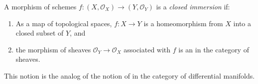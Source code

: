 \documentclass[12pt]{article}
\renewcommand{\O}{\mathcal{O}}
\newcommand{\lra}{\longrightarrow}
\begin{document}
A morphism of schemes $f: (X,\O_X) \lra (Y,\O_Y)$ is a {\em closed immersion} if:
\begin{enumerate}
\item As a map of topological spaces, $f: X \lra Y$ is a homeomorphism from $X$ into a closed subset of $Y$, and
\item the morphism of sheaves $\O_Y \lra \O_X$ associated with $f$ is an  in the category of sheaves.
\end{enumerate}

This notion is the analog of the notion of  in the category of differential manifolds.
\end{document}
